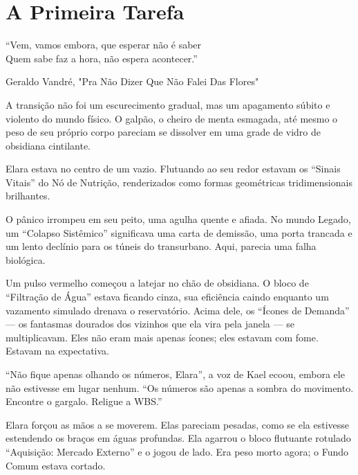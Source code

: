 
\chapter{A Primeira Tarefa}
\epigraph{``Vem, vamos embora, que esperar não é saber \\ Quem sabe faz a hora, não espera acontecer.''}{Geraldo Vandré, "Pra Não Dizer Que Não Falei Das Flores"}

A transição não foi um escurecimento gradual, mas um apagamento súbito e violento do mundo físico. O galpão, o cheiro de menta esmagada, até mesmo o peso de seu próprio corpo pareciam se dissolver em uma grade de vidro de obsidiana cintilante.

Elara estava no centro de um vazio. Flutuando ao seu redor estavam os ``Sinais Vitais'' do Nó de Nutrição, renderizados como formas geométricas tridimensionais brilhantes.


O pânico irrompeu em seu peito, uma agulha quente e afiada. No mundo Legado, um ``Colapso Sistêmico'' significava uma carta de demissão, uma porta trancada e um lento declínio para os túneis do transurbano. Aqui, parecia uma falha biológica.

Um pulso vermelho começou a latejar no chão de obsidiana. O bloco de ``Filtração de Água'' estava ficando cinza, sua eficiência caindo enquanto um vazamento simulado drenava o reservatório. Acima dele, os ``Ícones de Demanda'' --- os fantasmas dourados dos vizinhos que ela vira pela janela --- se multiplicavam. Eles não eram mais apenas ícones; eles estavam com fome. Estavam na expectativa.

``Não fique apenas olhando os números, Elara'', a voz de Kael ecoou, embora ele não estivesse em lugar nenhum. ``Os números são apenas a sombra do movimento. Encontre o gargalo. Religue a WBS.''

Elara forçou as mãos a se moverem. Elas pareciam pesadas, como se ela estivesse estendendo os braços em águas profundas. Ela agarrou o bloco flutuante rotulado ``Aquisição: Mercado Externo'' e o jogou de lado. Era peso morto agora; o Fundo Comum estava cortado.

